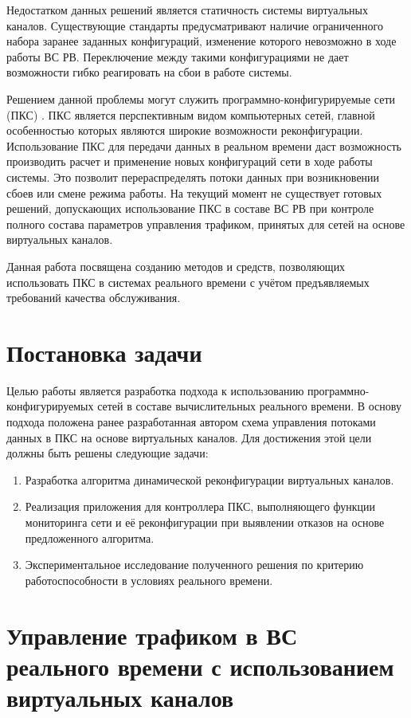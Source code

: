 \documentclass[12pt, a4paper]{article}
\begin{document}
Недостатком данных решений является статичность системы виртуальных каналов. Существующие стандарты предусматривают наличие ограниченного набора заранее заданных конфигураций, изменение которого невозможно в ходе работы ВС РВ. Переключение между такими конфигурациями не дает возможности гибко реагировать на сбои в работе системы.

Решением данной проблемы могут служить программно-конфигурируемые сети (ПКС) \cite{sdn}. ПКС является перспективным видом компьютерных сетей, главной особенностью которых являются широкие возможности реконфигурации. Использование ПКС для передачи данных в реальном времени даст возможность производить расчет и применение новых конфигураций сети в ходе работы системы. Это позволит перераспределять потоки данных при возникновении сбоев или смене режима работы. На текущий момент не существует готовых решений, допускающих использование ПКС в составе ВС РВ при контроле полного состава параметров управления трафиком, принятых для сетей на основе виртуальных каналов.

Данная работа посвящена созданию методов и средств, позволяющих использовать ПКС в системах реального времени с учётом предъявляемых требований качества обслуживания.

\section{Постановка задачи}
Целью работы является разработка подхода к использованию программно-конфигурируемых сетей в составе вычислительных реального времени. В основу подхода положена ранее разработанная автором схема управления потоками данных в ПКС на основе виртуальных каналов. Для достижения этой цели должны быть решены следующие задачи:
\begin{enumerate}
	\item Разработка алгоритма динамической реконфигурации виртуальных каналов.
	\item Реализация приложения для контроллера ПКС, выполняющего функции мониторинга сети и её реконфигурации при выявлении отказов на основе предложенного алгоритма.
	\item Экспериментальное исследование полученного решения по критерию работоспособности в условиях реального времени.
\end{enumerate}

\section{Управление трафиком в ВС реального времени с использованием виртуальных каналов} \label{sec:scheme}
\end{document}
